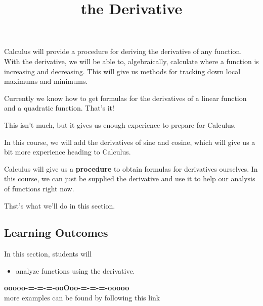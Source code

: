 \documentclass{ximera}
\title{the Derivative}
\begin{document}
\begin{abstract}
%
\end{abstract}
\maketitle




Calculus will provide a procedure for deriving the derivative of any function.  With the derivative, we will be able to, algebraically, calculate where a function is increasing and decreasing.  This will give us methods for tracking down local maximums and minimums.


Currently we know how to get formulas for the derivatives of a linear function and a quadratic function.  That's it! 

This isn't much, but it gives us enough experience to prepare for Calculus.


In this course, we will add the derivatives of sine and cosine, which will give us a bit more experience heading to Calculus.


Calculus will give us a \textbf{\textcolor{blue!55!black}{procedure}} to obtain formulas for derivatives ourselves.  In this course, we can just be supplied the derivative and use it to help our analysis of functions right now.


Thst's what we'll do in this section.






\subsection*{Learning Outcomes}


\begin{sectionOutcomes}
In this section, students will 

\begin{itemize}
\item analyze functions using the derivative.
\end{itemize}
\end{sectionOutcomes}














\begin{center}
\textbf{\textcolor{green!50!black}{ooooo-=-=-=-ooOoo-=-=-=-ooooo}} \\

more examples can be found by following this link\\ 

\end{center}
\end{document}
